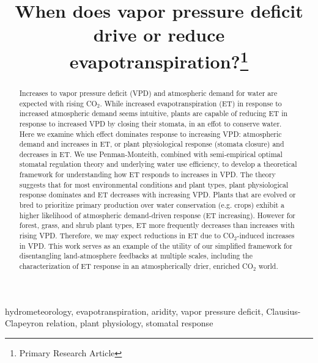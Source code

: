\documentclass[draft,linenumbers]{gcbjournal}
\begin{document}
\title{When does vapor pressure deficit drive or reduce evapotranspiration?\footnote{Primary Research Article}}





\begin{keypoints}
\item hydrometeorology, evapotranspiration, aridity, vapor pressure deficit, Clausius-Clapeyron relation, plant physiology, stomatal response
\end{keypoints}


\begin{abstract}
  Increases to vapor pressure deficit (VPD) and atmospheric demand for water are expected with rising CO$_2$. While increased evapotranspiration (ET) in response to increased atmospheric demand seems intuitive, plants are capable of reducing ET in response to increased VPD by closing their stomata, in an effot to conserve water. Here we examine which effect dominates response to increasing VPD: atmospheric demand and increases in ET, or plant physiological response (stomata closure) and decreases in ET. We use Penman-Monteith, combined with semi-empirical optimal stomatal regulation theory and underlying water use efficiency, to develop a theoretical framework for understanding how ET responds to increases in VPD.
  The theory suggests that for most environmental conditions and plant types, plant physiological response dominates and ET decreases with increasing VPD. Plants that are evolved or bred to prioritize primary production over water conservation (e.g. crops) exhibit a higher likelihood of atmospheric demand-driven response (ET increasing). However for forest, grass, and shrub plant types, ET more frequently decreases than increases with rising VPD. Therefore, we may expect reductions in ET due to CO$_2$-induced increases in VPD. This work serves as an example of the utility of our simplified framework for disentangling land-atmosphere feedbacks at multiple scales, including the characterization of ET response in an atmospherically drier, enriched CO$_2$ world. 
 
\end{abstract}
\end{document}
